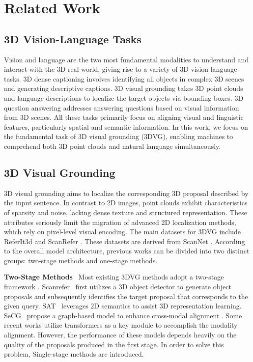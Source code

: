 \documentclass[lettersize,journal]{IEEEtran}
\begin{document}
\section{Related Work} \label{sec:relatedWork}
\subsection{3D Vision-Language Tasks}
\par Vision and language are the two most fundamental modalities to understand and interact with the 3D real world, giving rise to a variety of 3D vision-language tasks.
3D dense captioning \cite{Scan2Cap, X-Trans2Cap, Vote2Cap} involves identifying all objects in complex 3D scenes and generating descriptive captions. 3D visual grounding \cite{scanrefer, Referit3d, bottom} takes 3D point clouds and language descriptions to localize the target objects via bounding boxes. 
3D question answering \cite{ScanQA, SQA3d} addresses answering questions based on visual information from 3D scenes.
All these tasks primarily focus on aligning visual and linguistic features, particularly spatial and semantic information.
In this work, we focus on the fundamental task of 3D visual grounding (3DVG), enabling machines to comprehend both 3D point clouds and natural language simultaneously.

\subsection{3D Visual Grounding}
\par 3D visual grounding aims to localize the corresponding 3D proposal described by the input sentence. In contrast to 2D images, point clouds exhibit characteristics of sparsity and noise, lacking dense texture and structured representation. These attributes seriously limit the migration of advanced 2D localization methods, which rely on pixel-level visual encoding. 
The main datasets for 3DVG include ReferIt3d \cite{Referit3d} and ScanRefer \cite{scanrefer}. These datasets are derived from ScanNet \cite{scannet}.
According to the overall model architecture,  previous works can be divided into two distinct groups: two-stage methods and one-stage methods.


\par \textbf{Two-Stage Methods}~ Most existing 3DVG methods adopt a two-stage framework \cite{scanrefer, 3dvg, sat, multiviewtrans}. Scanrefer~\cite{scanrefer} first utilizes a 3D object detector to generate object proposals and subsequently identifies the target proposal that corresponds to the given query. 
SAT~\cite{sat} leverages 2D semantics to assist 3D representation learning.
SeCG~\cite{secg} propose a graph-based model to enhance cross-modal alignment 
.
Some recent works \cite{3dvg, 3drpnet, vpp}
utilize transformers\cite{transformer} as a key module to accomplish the modality alignment.
However, the performance of these models depends heavily on the quality of the proposals produced in the first stage. In order to solve this problem, Single-stage methods are introduced.
\end{document}
